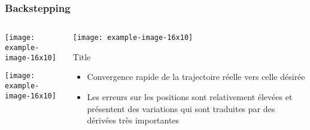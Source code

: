 \documentclass[xcolor=table]{beamer}
\begin{document}
\begin{frame}
    \frametitle{Backstepping}
    \begin{columns}[T]
        \begin{column}{.49\textwidth}
            \texttt{[image: example-image-16x10]}

            \texttt{[image: example-image-16x10]}
        \end{column}
        \begin{column}{.49\textwidth}
            \texttt{[image: example-image-16x10]}

            \begin{block}{Title}
                \addtolength{\leftmargini}{\labelsep}
                \begin{itemize}
                \item Convergence rapide de la trajectoire réelle vers celle désirée
                \item Les erreurs sur les positions sont relativement élevées et présentent des variations qui sont traduites par des dérivées très importantes
            \end{itemize}
        \end{block}
    \end{column}
  \end{columns}
\end{frame}
\end{document}
